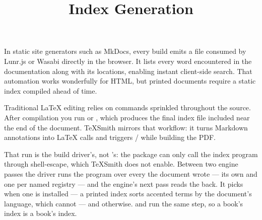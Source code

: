 \documentclass[a4paper,twoside]{article}
\title{Index Generation}
\author{}\date{}
\begin{document}
\maketitle
{}\label{index-tags}
In static site generators such as MkDocs, every build emits a 
file consumed by Lunr.js or Wasabi directly in the browser. It lists every word
encountered in the documentation along with its locations, enabling instant
client-side search. That automation works wonderfully for HTML, but printed
documents require a static index compiled ahead of time.

Traditional \LaTeX{} editing relies on  commands sprinkled throughout
the source. After compilation you run  or , which produces the
final index file included near the end of the document. TeXSmith mirrors that
workflow: it turns Markdown annotations into \LaTeX{}  calls and
triggers / while building the PDF.

That run is the build driver's, not 's: the package can only call the
index program through shell-escape, which TeXSmith does not enable. Between two
engine passes the driver runs the program over every  the document wrote
--- its own and one per named registry --- and the engine's next pass reads the
 back. It picks  when one is installed --- a printed index sorts
accented terms by the document's language, which  cannot --- and
 otherwise.  and  run
the same step, so a book's index is a book's index.
\end{document}
